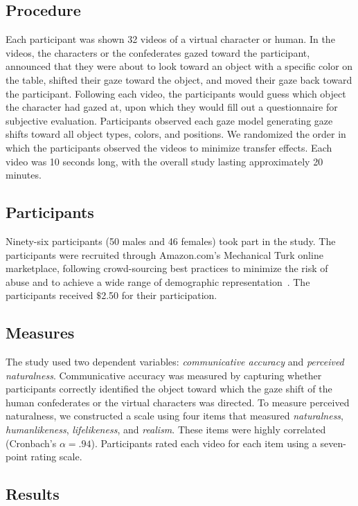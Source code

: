 \subsection{Procedure}

Each participant was shown 32 videos of a virtual character or human. In the videos, the characters or the confederates gazed toward the participant, announced that they were about to look toward an object with a specific color on the table, shifted their gaze toward the object, and moved their gaze back toward the participant. Following each video, the participants would guess which object the character had gazed at, upon which they would fill out a questionnaire for subjective evaluation. Participants observed each gaze model generating gaze shifts toward all object types, colors, and positions. We randomized the order in which the participants observed the videos to minimize transfer effects. Each video was 10 seconds long, with the overall study lasting approximately 20 minutes.

\subsection{Participants}

Ninety-six participants (50 males and 46 females) took part in the study. The participants were recruited through Amazon.com's Mechanical Turk online marketplace, following crowd-sourcing best practices to minimize the risk of abuse and to achieve a wide range of demographic representation~\cite{kittur2008crowdsourcing}. The participants received $\$$2.50 for their participation.

\subsection{Measures}

The study used two dependent variables: \emph{communicative accuracy} and \emph{perceived naturalness}. Communicative accuracy was measured by capturing whether participants correctly identified the object toward which the gaze shift of the human confederates or the virtual characters was directed. To measure perceived naturalness, we constructed a scale using four items that measured \emph{naturalness}, \emph{humanlikeness}, \emph{lifelikeness}, and \emph{realism}. These items were highly correlated (Cronbach's $\alpha = .94$). Participants rated each video for each item using a seven-point rating scale.

\subsection{Results}


